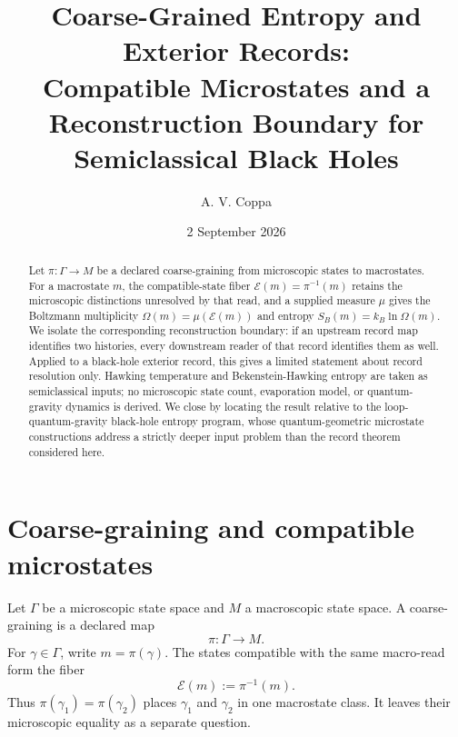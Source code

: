 \documentclass[aps,prd,reprint,nofootinbib,superscriptaddress]{revtex4-2}
\begin{document}
\title{Coarse-Grained Entropy and Exterior Records:\\Compatible Microstates and a Reconstruction Boundary for Semiclassical Black Holes}

\author{A. V. Coppa}
\date{2 September 2026}

\begin{abstract}
Let $\pi:\Gamma\to M$ be a declared coarse-graining from microscopic states to macrostates. For a macrostate $m$, the compatible-state fiber $\mathcal E(m)=\pi^{-1}(m)$ retains the microscopic distinctions unresolved by that read, and a supplied measure $\mu$ gives the Boltzmann multiplicity $\Omega(m)=\mu(\mathcal E(m))$ and entropy $S_B(m)=k_B\ln\Omega(m)$. We isolate the corresponding reconstruction boundary: if an upstream record map identifies two histories, every downstream reader of that record identifies them as well. Applied to a black-hole exterior record, this gives a limited statement about record resolution only. Hawking temperature and Bekenstein-Hawking entropy are taken as semiclassical inputs; no microscopic state count, evaporation model, or quantum-gravity dynamics is derived. We close by locating the result relative to the loop-quantum-gravity black-hole entropy program, whose quantum-geometric microstate constructions address a strictly deeper input problem than the record theorem considered here.
\end{abstract}

\maketitle

\section{Coarse-graining and compatible microstates}

Let $\Gamma$ be a microscopic state space and $M$ a macroscopic state space. A coarse-graining is a declared map
\begin{equation}
\pi:\Gamma\longrightarrow M.
\label{eq:coarse}
\end{equation}
For $\gamma\in\Gamma$, write $m=\pi(\gamma)$. The states compatible with the same macro-read form the fiber
\begin{equation}
\boxed{\mathcal E(m):=\pi^{-1}(m).}
\label{eq:fiber}
\end{equation}
Thus $\pi(\gamma_1)=\pi(\gamma_2)$ places $\gamma_1$ and $\gamma_2$ in one macrostate class. It leaves their microscopic equality as a separate question.
\end{document}
